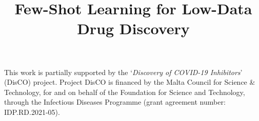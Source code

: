 \documentclass[journal=jcisd8,manuscript=article]{achemso} %
\title
  {Few-Shot Learning for Low-Data Drug Discovery}
\begin{document}













\begin{acknowledgement}

This work is partially supported by the `\textit{Discovery of COVID-19 Inhibitors}' (DisCO) project. Project DisCO is financed by the Malta Council for Science \& Technology, for and on behalf of the Foundation for Science and Technology, through the Infectious Diseases Programme (grant agreement number: IDP.RD.2021-05).

\end{acknowledgement}
\end{document}
